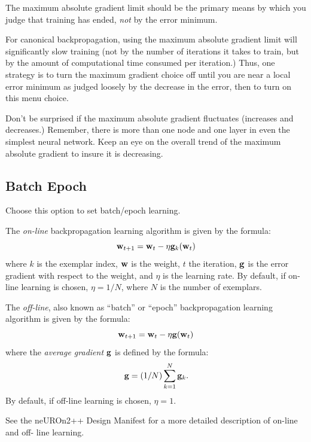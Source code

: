 \vspace{9 pt}{\bf \large \beginred READ THIS! \endcolor}

\beginred The maximum absolute gradient limit should be the primary
means by which you judge that training has ended, {\em not} by
the error minimum. \endcolor

For canonical backpropagation, using the maximum absolute gradient
limit will significantly slow training (not by the number of
iterations it takes to train, but by the amount of computational time
consumed per iteration.)  Thus, one strategy is to turn the maximum
gradient choice off until you are near a local error minimum as judged
loosely by the decrease in the error, then to turn on this menu
choice.

Don't be surprised if the maximum absolute gradient fluctuates
(increases and decreases.)  Remember, there is more than one node and
one layer in even the simplest neural network.  Keep an eye on the
overall trend of the maximum absolute gradient to insure it is
decreasing.

\subsection{Batch Epoch}

Choose this option to set batch/epoch learning.

The {\em on-line} backpropagation learning algorithm is given by the
formula:
\begin{equation}
{\bf w}_{t+1} = {\bf w}_t - \eta {\bf g}_k({\bf w}_t)
\end{equation}
where $k$ is the exemplar index, ${\bf w}$ is the weight, $t$ the
iteration, ${\bf g}$ is the error gradient with respect to the weight,
and $\eta$ is the learning rate.  By default, if on-line learning is
chosen, $\eta = 1/N$, where $N$ is the number of exemplars.

The {\em off-line}, also known as ``batch'' or ``epoch''
backpropagation learning algorithm is given by the formula:
\begin{equation}
{\bf w}_{t+1} = {\bf w}_t - \eta {\bf g}({\bf w}_t)
\end{equation}
where the {\em average gradient} ${\bf g}$ is defined by the formula:
\begin{equation}
{\bf g} = (1/N) \sum_{k=1}^N {\bf g}_k.
\end{equation}
By default, if off-line learning is chosen, $\eta = 1$.

See the neUROn2++ Design Manifest for a more detailed description of
on-line and off- line learning.


